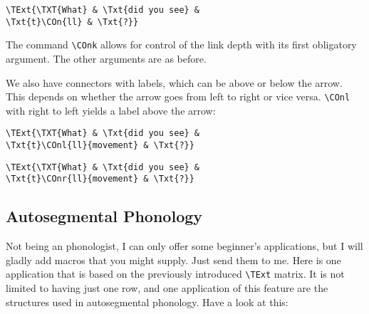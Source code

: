 \documentclass[12pt,a4paper]{article}
\begin{document}
\begin{minipage}[t]{5cm}
\end{minipage}
\begin{minipage}[t]{9cm}
\begin{verbatim}
\TExt{\TXT{What} & \Txt{did you see} & 
\Txt{t}\COn{ll} & \Txt{?}}
\end{verbatim}
\end{minipage}

The command \verb|\COnk| allows for control of the link depth with its first
obligatory argument. The other arguments are as before. 

We also have connectors with labels, which can be above or below the arrow. This
depends on whether the arrow goes from left to right or vice versa. \verb|\COnl|
with right to left yields a label above the arrow:

\begin{minipage}[t]{5cm}
\end{minipage}
\begin{minipage}[t]{9cm}
\begin{verbatim}
\TExt{\TXT{What} & \Txt{did you see} & 
\Txt{t}\COnl{ll}{movement} & \Txt{?}}
\end{verbatim}
\end{minipage}

\begin{minipage}[t]{5cm}
\end{minipage}
\begin{minipage}[t]{9cm}
\begin{verbatim}
\TExt{\TXT{What} & \Txt{did you see} & 
\Txt{t}\COnr{ll}{movement} & \Txt{?}}
\end{verbatim}
\end{minipage}

\subsection{Autosegmental Phonology}

Not being an phonologist, I can only offer some beginner's applications, but I will
gladly add macros that you might supply. Just send them to me. Here is one application
that is based on the previously introduced \verb|\TExt| matrix. It is not limited to
having just one row, and one application of this feature are the structures used in
autosegmental phonology. Have a look at this:
\end{document}
